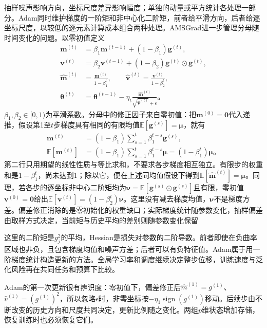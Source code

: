抽样噪声影响方向，坐标尺度差异影响幅度；单独的动量或平方统计各处理一部分。Adam同时维护梯度的一阶矩和非中心化二阶矩，前者给平滑方向，后者给逐坐标尺度，以较低的逐元素计算成本组合两种处理。AMSGrad进一步管理分母随时间变化的问题。以零初值定义
\begin{align}
  \bm m^{(t)}&=\beta_1\bm m^{(t-1)}+(1-\beta_1)\bm g^{(t)},\\
  \bm v^{(t)}&=\beta_2\bm v^{(t-1)}+(1-\beta_2)
                 \bm g^{(t)}\odot\bm g^{(t)},\\
  \hat{\bm m}^{(t)}&=\frac{\bm m^{(t)}}{1-\beta_1^t},\qquad
  \hat{\bm v}^{(t)}=\frac{\bm v^{(t)}}{1-\beta_2^t},\\
  \bm\theta^{(t)}&=\bm\theta^{(t-1)}-
    \eta_t\frac{\hat{\bm m}^{(t)}}{\sqrt{\hat{\bm v}^{(t)}}+\epsilon}\text{。}
  \label{eq:training-adam}
\end{align}
$\beta_1,\beta_2\in[0,1)$为平滑系数。分母中的修正因子来自零初值：把$\bm m^{(0)}=\bm0$代入递推，假设第1至$t$步梯度具有相同的有限均值$\mathbb E[\bm g^{(s)}]=\bm\mu$，就有
\begin{equation}
  \begin{aligned}
    \bm m^{(t)}&=(1-\beta_1)\sum_{s=1}^{t}\beta_1^{t-s}\bm g^{(s)},\\
    \mathbb E[\bm m^{(t)}]
      &=(1-\beta_1)\sum_{s=1}^{t}\beta_1^{t-s}\bm\mu
        =(1-\beta_1^t)\bm\mu\text{。}
  \end{aligned}
  \label{eq:training-adam-bias-correction}
\end{equation}
第二行只用期望的线性性质与等比求和，不要求各步梯度相互独立。有限步的权重和是$1-\beta_1^t$，尚未达到1；除以它，便在上述同均值假设下得到$\mathbb E[\hat{\bm m}^{(t)}]=\bm\mu$。同理，若各步的逐坐标非中心二阶矩均为$\bm\nu=\mathbb E[\bm g^{(s)}\odot\bm g^{(s)}]$且有限，零初值$\bm v^{(0)}=\bm0$给出$\mathbb E[\bm v^{(t)}]=(1-\beta_2^t)\bm\nu$。这里没有减去梯度均值，$\bm\nu$不是梯度方差。偏差修正消除的是零初始化的权重缺口；实际梯度统计随参数变化，抽样偏差由取样方式决定，当前矩与历史平均的差别则随参数变化保留

这里的二阶矩是$g_j^2$的平均，Hessian是损失对参数的二阶导数。前者即使在负曲率区域也非负，且包含梯度均值和噪声方差；后者可以有负特征值。Adam属于用一阶梯度统计构造更新的方法。全局学习率和调度继续决定整步位移，训练速度与泛化风险再在共同任务和预算下比较。

Adam的第一次更新很有辨识度：零初值下，偏差修正后$\hat m^{(1)}=g^{(1)}$、$\hat v^{(1)}=(g^{(1)})^2$，所以忽略$\epsilon$时，非零坐标按$-\eta_1\operatorname{sign}(g^{(1)})$移动。后续步由不断改变的历史方向和尺度共同决定，更新比例随之变化。两组$p$维状态增加存储，恢复训练时也必须恢复它们。

